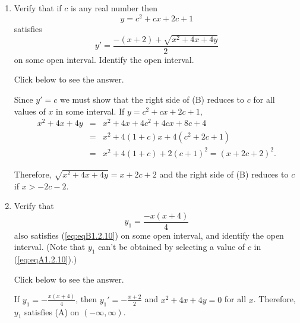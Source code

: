 \documentclass{ximera}
\begin{document}
\begin{problem}\label{exer:1.2.10}
\begin{enumerate}
\item %
Verify that if $c$ is any real number then
\begin{equation}\label{eq:eqA1.2.10}
y=c^2+cx+2c+1
\end{equation}
satisfies
\begin{equation}\label{eq:eqB1.2.10}
 y'=\frac{-(x+2)+\sqrt{x^2+4x+4y}}{2}
\end{equation}
on some open interval. Identify the open interval.

Click below to see the answer.

\begin{expandable}
    Since $y'=c$ we must show that the right side of
(B)  reduces to $c$ for all values of $x$
in some interval. If $y=c^2+cx+2c+1$,
\begin{eqnarray*}
x^2+4x+4y&=&x^2+4x+4c^2+4cx+8c+4\\
&=&x^2+4(1+c)x+4(c^2+2c+1)\\
&=&x^2+4(1+c)+2(c+1)^2=(x+2c+2)^2.
\end{eqnarray*}

Therefore, $\sqrt{x^2+4x+4y}=x+2c+2$ and the right side of
(B) reduces to $c$ if
$x>-2c-2$.
\end{expandable}

\item %
Verify that
$$
y_1=\frac{-x(x+4)}{4}
$$
also satisfies  (\ref{eq:eqB1.2.10}) on some open interval, and
identify the open interval. (Note that $y_1$ can't be obtained
by selecting a value of $c$ in (\ref{eq:eqA1.2.10}).)

Click below to see the answer.

\begin{expandable}
    If $y_1=-\frac{x(x+4)}{4}$, then $y_1'=-\frac{x+2}{2}$
and $x^2+4x+4y=0$ for all $x$. Therefore, $y_1$ satisfies
(A) on $(-\infty,\infty)$.
\end{expandable}
\end{enumerate}
\end{problem}
\end{document}
